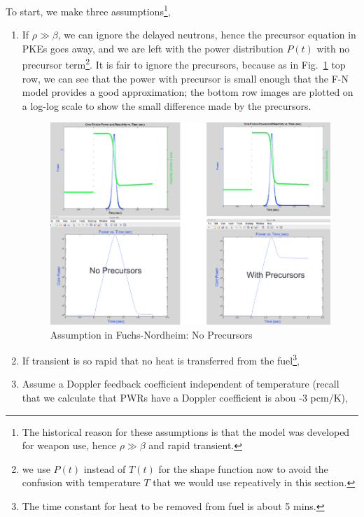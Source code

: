 \documentclass{school-22.211-notes}
\begin{document}
To start, we make three assumptions\footnote{The historical reason for these assumptions is that the model was developed for weapon use, hence $\rho \gg \beta$ and rapid transient.}, 
\begin{enumerate}
\item If $\rho \gg \beta$, we can ignore the delayed neutrons, hence the precursor equation in PKEs goes away, and we are left with the power distribution $P(t)$ with no precursor term\footnote{we use $P(t)$ instead of $T(t)$ for the shape function now to avoid the confusion with temperature $T$ that we would use repeatively in this section.}. 
  It is fair to ignore the precursors, because as in Fig.~\ref{fn1} top row, we can see that the power with precursor is small enough that the F-N model provides a good approximation; the bottom row images are plotted on a log-log scale to show the small difference made by the precursors.  
\begin{figure}[ht]
  \centering
  \includegraphics[width=6in]{images/pke/fn1.png}
  \caption{Assumption in Fuchs-Nordheim: No Precursors}\label{fn1}
\end{figure}

\item If transient is so rapid that no heat is transferred from the fuel\footnote{The time constant for heat to be removed from  fuel is about 5 mins.}, 

\item Assume a Doppler feedback coefficient independent of temperature (recall that we calculate that PWRs have a Doppler coefficient is abou -3 pcm/K), 
\end{enumerate}
\end{document}
